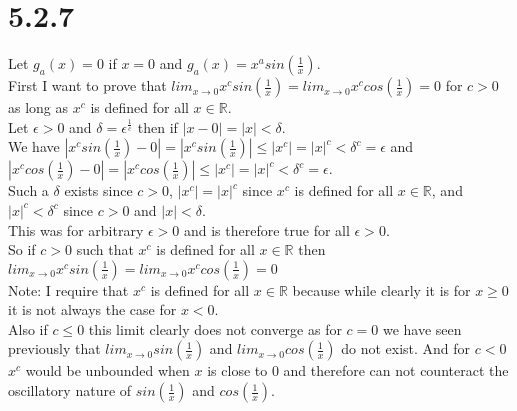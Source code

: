 \documentclass{article}
\begin{document}
\section*{5.2.7}
\begin{center}
    Let $g_a (x) = 0$ if $x = 0$ and $g_a (x) = x^a sin(\frac{1}{x})$.
    \\First I want to prove that $lim_{x\rightarrow 0} x^c sin(\frac{1}{x}) = lim_{x\rightarrow 0} x^c cos(\frac{1}{x}) = 0$ for $c > 0$ as long as $x^c$ is defined for all $x\in\mathbb{R}$.
    \\Let $\epsilon > 0$ and $\delta =\epsilon ^{\frac{1}{c}}$ then if $|x - 0| = |x| <\delta$.
    \\We have $|x^c sin(\frac{1}{x}) - 0| = |x^c sin(\frac{1}{x})|\leq |x^c| = |x|^c <\delta ^c =\epsilon$ and $|x^c cos(\frac{1}{x}) - 0| = |x^c cos(\frac{1}{x})|\leq |x^c| = |x|^c <\delta ^c =\epsilon$.
    \\Such a $\delta$ exists since $c > 0$, $|x^c| = |x|^c$ since $x^c$ is defined for all $x\in\mathbb{R}$, and $|x|^c <\delta ^c$ since $c > 0$ and $|x| <\delta$.
    \\This was for arbitrary $\epsilon > 0$ and is therefore true for all $\epsilon > 0$.
    \\So if $c > 0$ such that $x^c$ is defined for all $x\in\mathbb{R}$ then $lim_{x\rightarrow 0} x^c sin(\frac{1}{x}) = lim_{x\rightarrow 0} x^c cos(\frac{1}{x}) = 0$ \qedsymbol
    \\Note: I require that $x^c$ is defined for all $x\in\mathbb{R}$ because while clearly it is for $x\geq 0$ it is not always the case for $x < 0$.
    \\Also if $c\leq 0$ this limit clearly does not converge as for $c = 0$ we have seen previously that $lim_{x\rightarrow 0} sin(\frac{1}{x})$ and $lim_{x\rightarrow 0} cos(\frac{1}{x})$ do not exist. And for $c < 0$ $x^c$ would be unbounded when $x$ is close to 0 and therefore can not counteract the oscillatory nature of $sin(\frac{1}{x})$ and $cos(\frac{1}{x})$.
\end{center}
\end{document}
